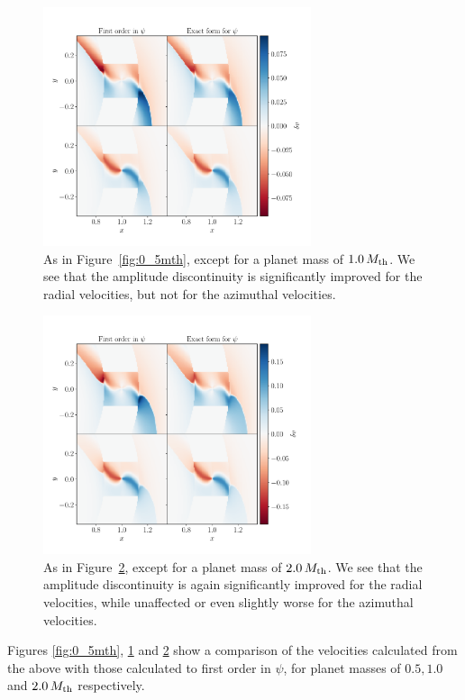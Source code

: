 \begin{figure}
    \centering
    \includegraphics[width = 0.7\textwidth]{figures/1_0_mth.pdf}
    \caption{As in Figure~\ref{fig:0_5mth}, except for a planet mass of $1.0 \, M_{\rm th}$. We see that the amplitude discontinuity is significantly improved for the radial velocities, but not for the azimuthal velocities.}
    \label{fig:1_0mth}
\end{figure}
\begin{figure}
    \centering
    \includegraphics[width = 0.7\textwidth]{figures/2_0_mth.pdf}
    \caption{As in Figure~\ref{fig:2_0mth}, except for a planet mass of $2.0 \, M_{\rm th}$. We see that the amplitude discontinuity is again significantly improved for the radial velocities, while unaffected or even slightly worse for the azimuthal velocities.}
    \label{fig:2_0mth}
\end{figure}
Figures \ref{fig:0_5mth}, \ref{fig:1_0mth} and \ref{fig:2_0mth} show a comparison of the velocities calculated from the above with those calculated to first order in $\psi$, for planet masses of $0.5, 1.0$ and $2.0 \, M_{\rm th}$ respectively. 
